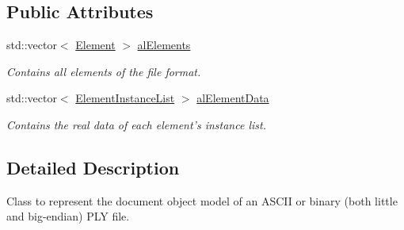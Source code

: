 \subsection*{Public Attributes}
\begin{DoxyCompactItemize}
\item 
\hypertarget{class_assimp_1_1_p_l_y_1_1_d_o_m_ac4ce8abe40105292c75968cc53d72201}{std\+::vector$<$ \hyperlink{class_assimp_1_1_p_l_y_1_1_element}{Element} $>$ \hyperlink{class_assimp_1_1_p_l_y_1_1_d_o_m_ac4ce8abe40105292c75968cc53d72201}{al\+Elements}}\label{class_assimp_1_1_p_l_y_1_1_d_o_m_ac4ce8abe40105292c75968cc53d72201}

\begin{DoxyCompactList}\small\item\em Contains all elements of the file format. \end{DoxyCompactList}\item 
\hypertarget{class_assimp_1_1_p_l_y_1_1_d_o_m_aadae1f548b4bec67f66720bfa0521de0}{std\+::vector$<$ \hyperlink{class_assimp_1_1_p_l_y_1_1_element_instance_list}{Element\+Instance\+List} $>$ \hyperlink{class_assimp_1_1_p_l_y_1_1_d_o_m_aadae1f548b4bec67f66720bfa0521de0}{al\+Element\+Data}}\label{class_assimp_1_1_p_l_y_1_1_d_o_m_aadae1f548b4bec67f66720bfa0521de0}

\begin{DoxyCompactList}\small\item\em Contains the real data of each element's instance list. \end{DoxyCompactList}\end{DoxyCompactItemize}


\subsection{Detailed Description}
Class to represent the document object model of an A\+S\+C\+I\+I or binary (both little and big-\/endian) P\+L\+Y file. 

